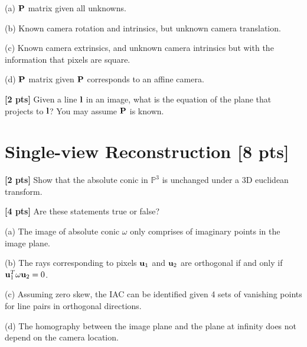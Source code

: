 \documentclass[11pt,addpoints,answers]{exam}
\numberwithin{equation}{section} %
\numberwithin{figure}{section} %
\numberwithin{table}{section} %
\begin{document}
\begin{questions}
(a) $\mathbf{P}$ matrix given all unknowns.

(b) Known camera rotation and intrinsics, but unknown camera translation.

(c) Known camera extrinsics, and unknown camera intrinsics but with the information that pixels are square.

(d) $\mathbf{P}$ matrix given $\mathbf{P}$ corresponds to an affine camera.

\begin{tcolorbox}[fit,height=5cm, width=\textwidth, blank, borderline={0.5pt}{-2pt},halign=left, valign=center, nobeforeafter]


\end{tcolorbox}

\question \textbf{[2 pts]} Given a line $\mathbf{l}$ in an image, what is the equation of the plane that projects to $\mathbf{l}$? You may assume $\mathbf{P}$ is known.

\begin{tcolorbox}[fit,height=5cm, width=\textwidth, blank, borderline={0.5pt}{-2pt},halign=left, valign=center, nobeforeafter]


\end{tcolorbox}

\section{Single-view Reconstruction [8 pts]}

\question \textbf{[2 pts]} Show that the absolute conic in $\mathbb{P}^3$ is unchanged under a 3D euclidean transform.

\begin{tcolorbox}[fit,height=5cm, width=\textwidth, blank, borderline={0.5pt}{-2pt},halign=left, valign=center, nobeforeafter]


\end{tcolorbox}

\question \textbf{[4 pts]} Are these statements true or false?

(a) The image of absolute conic $\omega$ only comprises of imaginary points in the image plane.

(b) The rays corresponding to pixels $\mathbf{u}_1$ and $\mathbf{u}_2$ are orthogonal if and only if $\mathbf{u}_1^T \omega \mathbf{u}_2 = 0$.

(c) Assuming zero skew, the IAC can be identified given 4 sets of vanishing points for line pairs in orthogonal directions.

(d) The homography between the image plane and the plane at infinity does not depend on the camera location.


\end{questions}
\end{document}
